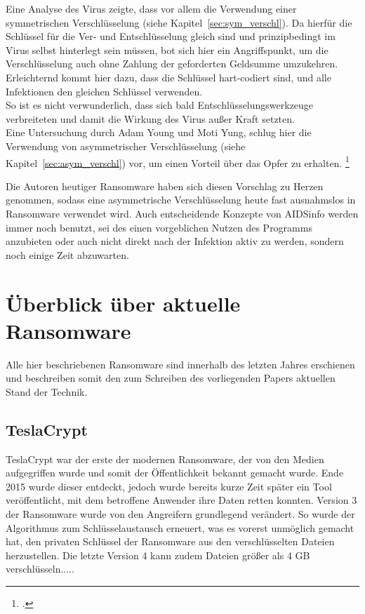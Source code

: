 		Eine Analyse des Virus zeigte, dass vor allem die Verwendung einer symmetrischen Verschlüsselung (siehe Kapitel~\ref{sec:sym_verschl}).
		Da hierfür die Schlüssel für die Ver- und Entschlüsselung gleich sind und prinzipbedingt im Virus selbst hinterlegt sein müssen, bot sich hier ein Angriffspunkt, um die
		Verschlüsselung auch ohne Zahlung der geforderten Geldsumme umzukehren. Erleichternd kommt hier dazu, dass die Schlüssel hart-codiert sind, und alle Infektionen
		den gleichen Schlüssel verwenden. \\
		So ist es nicht verwunderlich, dass sich bald Entschlüsselungswerkzeuge verbreiteten und damit die Wirkung des Virus außer Kraft setzten. \\
		Eine Untersuchung durch Adam Young und Moti Yung, schlug hier die Verwendung von asymmetrischer Verschlüsselung (siehe Kapitel~\ref{sec:asym_verschl}) vor, um einen
		Vorteil über das Opfer zu erhalten. \footcite{aids:young}

		Die Autoren heutiger Ransomware haben sich diesen Vorschlag zu Herzen genommen, sodass eine asymmetrische Verschlüsselung heute fast ausnahmslos in Ransomware
		verwendet wird. Auch entscheidende Konzepte von AIDSinfo werden immer noch benutzt, sei des einen vorgeblichen Nutzen des Programms anzubieten oder auch nicht
		direkt nach der Infektion aktiv zu werden, sondern noch einige Zeit abzuwarten.

\section{Überblick über aktuelle Ransomware}
\label{sec:overview}
		Alle hier beschriebenen Ransomware sind innerhalb des letzten Jahres erschienen und beschreiben somit den zum Schreiben des vorliegenden Papers aktuellen Stand der Technik.

		\subsection{TeslaCrypt}
			TeslaCrypt war der erste der modernen Ransomware, der von den Medien aufgegriffen wurde und somit der Öffentlichkeit bekannt gemacht wurde. Ende 2015\cite{tesla:entdeckt} wurde dieser entdeckt, jedoch wurde bereits kurze Zeit später ein Tool veröffentlicht\cite{tesla:geknackt}, mit dem betroffene Anwender ihre Daten retten konnten.
			Version 3 der Ransomware wurde von den Angreifern grundlegend verändert. So wurde der Algorithmus zum Schlüsselaustausch erneuert, was es vorerst unmöglich gemacht hat, den privaten Schlüssel der Ransomware aus den verschlüsselten Dateien herzustellen\cite{tesla:version3}\cite{tesla:version3_2}.
			Die letzte Version 4 kann zudem Dateien größer als 4 GB verschlüsseln\cite{tesla:version4}.....
